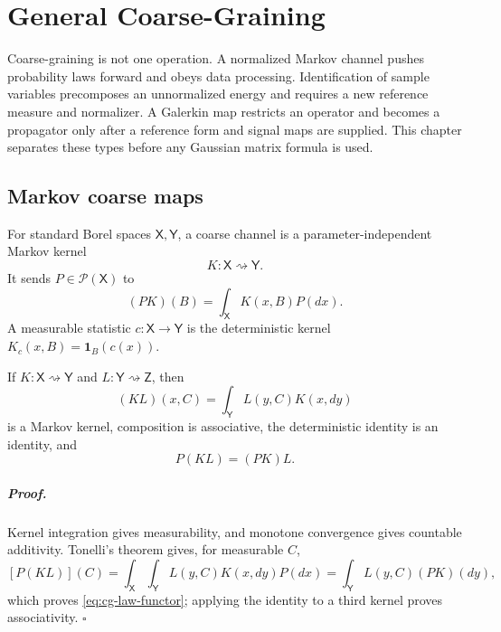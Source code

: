 \chapter{General Coarse-Graining}
\label{ch:coarsegraining}

Coarse-graining is not one operation. A normalized Markov channel pushes
probability laws forward and obeys data processing. Identification of sample
variables precomposes an unnormalized energy and requires a new reference
measure and normalizer. A Galerkin map restricts an operator and becomes a
propagator only after a reference form and signal maps are supplied. This
chapter separates these types before any Gaussian matrix formula is used.

\section{Markov coarse maps}
\label{sec:cg-markov-category}

For standard Borel spaces \(\mathsf X,\mathsf Y\), a coarse channel is a
parameter-independent Markov kernel
\[
K:\mathsf X\rightsquigarrow\mathsf Y.
\]
It sends \(P\in\mathcal P(\mathsf X)\) to
\begin{equation}
(PK)(B)=\int_{\mathsf X}K(x,B)P(dx).
\label{eq:cg-markov-pushforward}
\end{equation}
A measurable statistic \(c:\mathsf X\to\mathsf Y\) is the deterministic
kernel \(K_c(x,B)=\mathbf 1_B(c(x))\). 

If \(K:\mathsf X\rightsquigarrow\mathsf Y\) and
\(L:\mathsf Y\rightsquigarrow\mathsf Z\), then
\begin{equation}
(KL)(x,C)=\int_{\mathsf Y}L(y,C)K(x,dy)
\label{eq:cg-kernel-composition}
\end{equation}
is a Markov kernel, composition is associative, the deterministic identity is
an identity, and
\begin{equation}
P(KL)=(PK)L .
\label{eq:cg-law-functor}
\end{equation}

\paragraph{Proof.}
Kernel integration gives measurability, and monotone convergence gives
countable additivity. Tonelli's theorem gives, for measurable \(C\),
\[
[P(KL)](C)
=\int_{\mathsf X}\int_{\mathsf Y}L(y,C)K(x,dy)P(dx)
=\int_{\mathsf Y}L(y,C)(PK)(dy),
\]
which proves \eqref{eq:cg-law-functor}; applying the identity to a third
kernel proves associativity. \(\square\)

